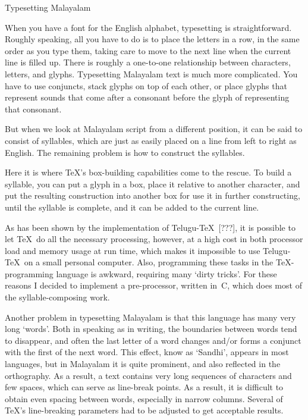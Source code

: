 \beginsection Typesetting Malayalam

When you have a font for the English alphabet, typesetting is
straightforward. Roughly speaking, all you have to do is to place the
letters in a row, in the same order as you type them, taking care to
move to the next line when the current line is filled up. There is
roughly a one-to-one relationship between characters, letters, and
glyphs. Typesetting Malayalam text is much more complicated. You have
to use conjuncts, stack glyphs on top of each other, or place glyphs
that represent sounds that come after a consonant before the glyph of
representing that consonant.

But when we look at Malayalam script from a different position, it can
be said to consist of syllables, which are just as easily placed on a
line from left to right as English. The remaining problem is how to
construct the syllables.

Here it is where \TeX's box-building capabilities come to the rescue.
To build a syllable, you can put a glyph in a box, place it relative
to another character, and put the resulting construction into another
box for use it in further constructing, until the syllable is
complete, and it can be added to the current line.

As has been shown by the implementation of Telugu-\TeX\ [???], it is
possible to let \TeX\ do all the necessary processing, however, at a
high cost in both processor load and memory usage at run time, which
makes it impossible to use Telugu-\TeX\ on a small personal computer.
Also, programming these tasks in the \TeX-programming language is
awkward, requiring many `dirty tricks'. For these reasons I decided to
implement a pre-processor, written in~C, which does most of the
syllable-composing work.

Another problem in typesetting Malayalam is that this language has
many very long `words'. Both in speaking as in writing, the boundaries
between words tend to disappear, and often the last letter of a word
changes and/or forms a conjunct with the first of the next word. This
effect, know as `Sandhi', appears in most languages, but in Malayalam
it is quite prominent, and also reflected in the orthography. As a
result, a text contains very long sequences of characters and few
spaces, which can serve as line-break points. As a result, it is
difficult to obtain even spacing between words, especially in narrow
columns. Several of \TeX's line-breaking parameters had to be adjusted
to get acceptable results.

